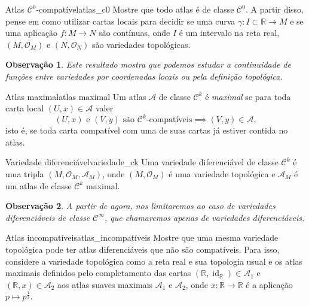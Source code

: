 \documentclass[12pt,a4paper]{article}
\numberwithin{equation}{section}
\newcommand\id[1]{\operatorname{id}_{#1}}
\newcommand\topology[1]{\ensuremath{\left(#1, \mathcal{O}_{#1}\right)}}
\newcommand\manifold[1]{\ensuremath{\left(#1, \mathcal{O}_{#1}, \mathscr{A}_{#1}\right)}}
\newtheorem{remark}{Observação}[section]
\begin{document}
\begin{exercício}{Atlas \(\mathcal{C}^0\)-compatível}{atlas_c0}
    Mostre que todo atlas é de classe \(\mathcal{C}^0\). A partir disso, pense em como utilizar cartas locais para decidir se uma curva \(\gamma : I \subset \mathbb{R} \to M\) e se uma aplicação \(f : M \to N\) são contínuas, onde \(I\) é um intervalo na reta real, \topology{M} e \topology{N} são variedades topológicas.
\end{exercício}
\begin{remark}
    Este resultado mostra que podemos estudar a continuidade de funções entre variedades por coordenadas locais ou pela definição topológica.
\end{remark}

\begin{definition}{Atlas maximal}{atlas maximal}
    Um atlas \(\mathscr{A}\) de classe \(\mathcal{C}^k\) é \emph{maximal} se para toda carta local \((U, x) \in \mathscr{A}\) valer
    \begin{equation*}
        (U,x)\text{ e }(V, y)\text{ são }\mathcal{C}^k\text{-compatíveis} \implies (V,y) \in \mathscr{A},
    \end{equation*}
    isto é, se toda carta compatível com uma de suas cartas já estiver contida no atlas.
\end{definition}

\begin{definition}{Variedade diferenciável}{variedade_ck}
    Uma variedade diferenciável de classe \(\mathcal{C}^k\) é uma tripla \manifold{M}, onde \topology{M} é uma variedade topológica e \(\mathscr{A}_M\) é um atlas de classe \(\mathcal{C}^k\) maximal.
\end{definition}
\begin{remark}
    A partir de agora, nos limitaremos ao caso de variedades diferenciáveis de classe \(\mathcal{C}^\infty\), que chamaremos apenas de variedades diferenciáveis.
\end{remark}

\begin{exercício}{Atlas incompatíveis}{atlas_incompatíveis}
    Mostre que uma mesma variedade topológica pode ter atlas diferenciáveis que não são compatíveis. Para isso, considere a variedade topológica como a reta real e sua topologia usual e os atlas maximais definidos pelo completamento das cartas \((\mathbb{R}, \id{\mathbb{R}}) \in \mathscr{A}_1\) e \((\mathbb{R},x) \in \mathscr{A}_2\) aos atlas suaves maximais \(\mathscr{A}_1\) e \(\mathscr{A}_2\), onde \(x : \mathbb{R} \to \mathbb{R}\) é a aplicação \(p \mapsto p^{\frac13}\).
\end{exercício}
\end{document}
